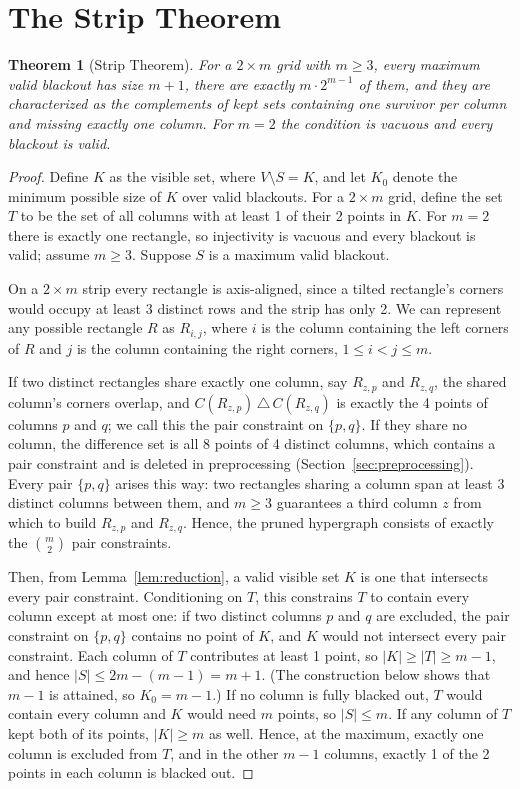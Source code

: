 \documentclass[12pt]{article}
\newtheorem{theorem}{Theorem}
\theoremstyle{definition}\newtheorem{definition}{Definition}
\theoremstyle{remark}\newtheorem{remark}{Remark}
\begin{document}
\section{The Strip Theorem}\label{sec:strip}
\begin{theorem}[Strip Theorem]\label{thm:strip}
For a $2\times m$ grid with $m\ge 3$, every maximum valid blackout has size $m+1$,
there are exactly $m\cdot 2^{m-1}$ of them, and they are characterized as the complements
of kept sets containing one survivor per column and missing exactly one column. For
$m=2$ the condition is vacuous and every blackout is valid.
\end{theorem}
\begin{proof}
Define $K$ as the visible set, where $V \setminus S = K$, and let $K_0$ denote the
minimum possible size of $K$ over valid blackouts. For a $2\times m$ grid, define the
set $T$ to be the set of all columns with at least 1 of their 2 points in $K$. For
$m=2$ there is exactly one rectangle, so injectivity is vacuous and every blackout is
valid; assume $m\ge 3$. Suppose $S$ is a maximum valid blackout.

On a $2\times m$ strip every rectangle is axis-aligned, since a tilted rectangle's
corners would occupy at least 3 distinct rows and the strip has only 2. We can represent any
possible rectangle $R$ as $R_{i,j}$, where $i$ is the column containing the left
corners of $R$ and $j$ is the column containing the right corners, $1\leq i < j \leq m$.


If two distinct rectangles share exactly one column, say $R_{z,p}$ and $R_{z,q}$, the
shared column's corners overlap, and $C(R_{z,p}) \,\triangle\, C(R_{z,q})$ is exactly
the 4 points of columns $p$ and $q$; we call this the pair constraint on $\{p,q\}$. If they
share no column, the difference set is all 8 points of 4 distinct columns, which
contains a pair constraint and is deleted in preprocessing
(Section~\ref{sec:preprocessing}). Every pair $\{p,q\}$ arises this way: two
rectangles sharing a column span at least 3 distinct columns between them, and
$m\geq 3$ guarantees a third column $z$ from which to build $R_{z,p}$ and $R_{z,q}$.
Hence, the pruned hypergraph consists of exactly the $\binom{m}{2}$ pair constraints.

Then, from Lemma~\ref{lem:reduction}, a valid visible set $K$ is one that intersects
every pair constraint. Conditioning on $T$, this constrains $T$ to contain every column
except at most one: if two distinct columns $p$ and $q$ are excluded, the pair constraint on
$\{p,q\}$ contains no point of $K$, and $K$ would not intersect every pair constraint. Each
column of $T$ contributes at least 1 point, so $\vert K\vert \geq \vert T\vert \geq
m-1$, and hence $\vert S\vert \leq 2m-(m-1)=m+1$. (The construction below shows
that $m-1$ is attained, so $K_0=m-1$.) If no column is
fully blacked out, $T$ would contain every column and $K$ would need $m$ points, so
$\vert S\vert \leq m$. If any column of $T$ kept both of its points, $\vert K \vert
\geq m$ as well. Hence, at the maximum, exactly one column is excluded from $T$, and
in the other $m-1$ columns, exactly 1 of the 2 points in each column is blacked out.



\end{proof}
\end{document}
